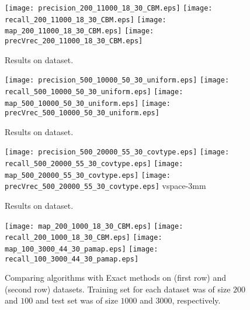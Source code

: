 \documentclass{sig-alternate}
\newlength{\figsize} \setlength{\figsize}{0.22\textwidth}
\begin{document}
\begin{figure}[t!]
\begin{centering}
\texttt{[image: precision\_200\_11000\_18\_30\_CBM.eps]}
\texttt{[image: recall\_200\_11000\_18\_30\_CBM.eps]}
\texttt{[image: map\_200\_11000\_18\_30\_CBM.eps]}
\texttt{[image: precVrec\_200\_11000\_18\_30\_CBM.eps]}
\vspace{-3mm}
\caption{\label{fig:cbm}
Results on  dataset.}  
\vspace{-2mm}
\end{centering}
\end{figure}


\begin{figure}[t!]
\begin{centering}
\texttt{[image: precision\_500\_10000\_50\_30\_uniform.eps]}
\texttt{[image: recall\_500\_10000\_50\_30\_uniform.eps]}
\texttt{[image: map\_500\_10000\_50\_30\_uniform.eps]}
\texttt{[image: precVrec\_500\_10000\_50\_30\_uniform.eps]}
\vspace{-3mm}
\caption{\label{fig:uniform}
Results on  dataset.}  
\vspace{-2mm}
\end{centering}
\end{figure}


\begin{figure}[t!]
\begin{centering}
\texttt{[image: precision\_500\_20000\_55\_30\_covtype.eps]}
\texttt{[image: recall\_500\_20000\_55\_30\_covtype.eps]}
\texttt{[image: map\_500\_20000\_55\_30\_covtype.eps]}
\texttt{[image: precVrec\_500\_20000\_55\_30\_covtype.eps]}
vspace{-3mm}
\caption{\label{fig:covtype}
Results on  dataset.}  
\vspace{-2mm}
\end{centering}
\end{figure}


\begin{figure}[t!]
\begin{centering}
\texttt{[image: map\_200\_1000\_18\_30\_CBM.eps]}
\texttt{[image: recall\_200\_1000\_18\_30\_CBM.eps]}
\texttt{[image: map\_100\_3000\_44\_30\_pamap.eps]}
\texttt{[image: recall\_100\_3000\_44\_30\_pamap.eps]}
\vspace{-3mm}
\caption{\label{fig:exact_cbm_pamap}
Comparing algorithms with Exact methods on  (first row) and  (second row) datasets. Training set for each dataset was of size $200$ and $100$ and test set was of size $1000$ and $3000$, respectively.}  
\vspace{-2mm}
\end{centering}
\end{figure}
\end{document}
